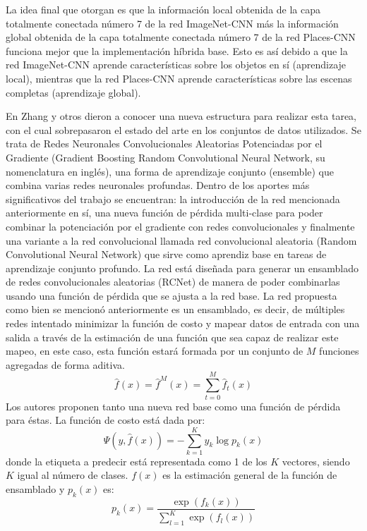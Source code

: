 La idea final que otorgan es que la información local obtenida de la capa totalmente conectada número 7 de la red ImageNet-CNN más la información global obtenida de la capa totalmente conectada número 7 de la red Places-CNN funciona mejor que la implementación híbrida base. Esto es así debido a que la red ImageNet-CNN aprende características sobre los objetos en sí (aprendizaje local), mientras que la red Places-CNN aprende características sobre las escenas completas (aprendizaje global).

En \cite{scene_classification_using_gbrcn} Zhang y otros dieron a conocer una nueva estructura para realizar esta tarea, con el cual sobrepasaron el estado del arte en los conjuntos de datos utilizados. Se trata de Redes Neuronales Convolucionales Aleatorias Potenciadas por el Gradiente (Gradient Boosting Random Convolutional Neural Network, su nomenclatura en inglés), una forma de aprendizaje conjunto (ensemble) que combina varias redes neuronales profundas.
Dentro de los aportes más significativos del trabajo se encuentran: la introducción de la red mencionada anteriormente en sí, una nueva función de pérdida multi-clase para poder combinar la potenciación por el gradiente con redes convolucionales y finalmente una variante a la red convolucional llamada red convolucional aleatoria (Random Convolutional Neural Network) que sirve como aprendiz base en tareas de aprendizaje conjunto profundo.
La red está diseñada para generar un ensamblado de redes convolucionales aleatorias (RCNet) de manera de poder combinarlas usando una función de pérdida que se ajusta a la red base. La red propuesta como bien se mencionó anteriormente es un ensamblado, es decir, de múltiples redes intentado minimizar la función de costo y mapear datos de entrada con una salida a través de la estimación de una función que sea capaz de realizar este mapeo, en este caso, esta función estará formada por un conjunto de \(M\) funciones agregadas de forma aditiva. 
\begin{equation}
\hat{f}(x)=\hat{f}^{M}(x)=\sum_{t=0}^{M} \hat{f}_{t}(x)
\end{equation}
Los autores proponen tanto una nueva red base como una función de pérdida para éstas. La función de costo está dada por:
\begin{equation}
\Psi(y, \hat{f}(x))=-\sum_{k=1}^{K} y_{k} \log p_{k}(x)
\end{equation}
donde la etiqueta a predecir está representada como 1 de los \(K\) vectores, siendo \(K\) igual al número de clases. \(f(x)\) es la estimación general de la función de ensamblado y \(p_{k}(x)\) es:
\begin{equation}
p_{k}(x)=\frac{\exp \left(f_{k}(x)\right)}{\sum_{l=1}^{K} \exp \left(f_{l}(x)\right)}
\end{equation}

